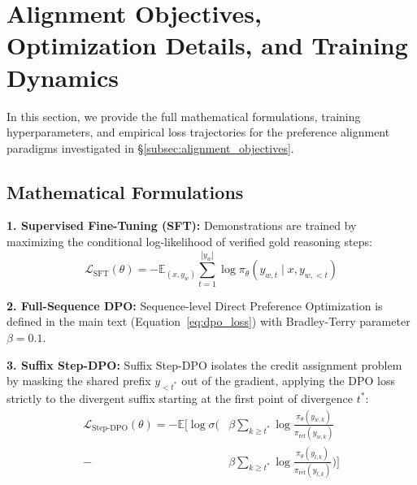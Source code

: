 \documentclass[11pt]{article}
\begin{document}
\clearpage
\nocite{*}


\clearpage
\appendix

\section{Alignment Objectives, Optimization Details, and Training Dynamics}
\label{sec:appendix_objectives}

In this section, we provide the full mathematical formulations, training hyperparameters, and empirical loss trajectories for the preference alignment paradigms investigated in \S\ref{subsec:alignment_objectives}.

\subsection{Mathematical Formulations}
\label{subsec:appendix_formulas}

\textbf{1. Supervised Fine-Tuning (SFT):} Demonstrations are trained by maximizing the conditional log-likelihood of verified gold reasoning steps:
\begin{equation}
    \mathcal{L}_{\text{SFT}}(\theta) = -\mathbb{E}_{(x, y_w)} \sum_{t=1}^{|y_w|} \log \pi_\theta(y_{w,t} \mid x, y_{w,<t})
    \label{eq:sft_loss}
\end{equation}

\textbf{2. Full-Sequence DPO:} Sequence-level Direct Preference Optimization \citep{rafailov2023dpo} is defined in the main text (Equation~\ref{eq:dpo_loss}) with Bradley-Terry parameter $\beta = 0.1$.

\textbf{3. Suffix Step-DPO:} Suffix Step-DPO \citep{lai2024stepdpo} isolates the credit assignment problem by masking the shared prefix $y_{<t^*}$ out of the gradient, applying the DPO loss strictly to the divergent suffix starting at the first point of divergence $t^*$:
\begin{align}
    \mathcal{L}_{\text{Step-DPO}}(\theta) = -\mathbb{E} \Big[ \log \sigma \Big( & \beta \sum_{k \ge t^*} \log \tfrac{\pi_\theta(y_{w,k})}{\pi_{\text{ref}}(y_{w,k})} \nonumber \\
    {} - & \beta \sum_{k \ge t^*} \log \tfrac{\pi_\theta(y_{l,k})}{\pi_{\text{ref}}(y_{l,k})} \Big) \Big]
    \label{eq:stepdpo_loss}
\end{align}
\end{document}
